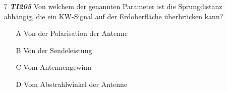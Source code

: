 \begin{enumerate} 
\itemsep1pt\parskip0pt
\item[7] \emph{\textbf{TI205}}   Von welchem der genannten Parameter ist die Sprungdistanz abhängig, die ein KW-Signal auf der Erdoberfläche überbrücken kann?
	\begin{enumerate}
	\itemsep1pt\parskip0pt
		\item[A] Von der Polarisation der Antenne
		\item[B] Von der Sendeleistung
		\item[C] Vom Antennengewinn
		\item[D] Vom Abstrahlwinkel der Antenne
	\end{enumerate}
\end{enumerate}

